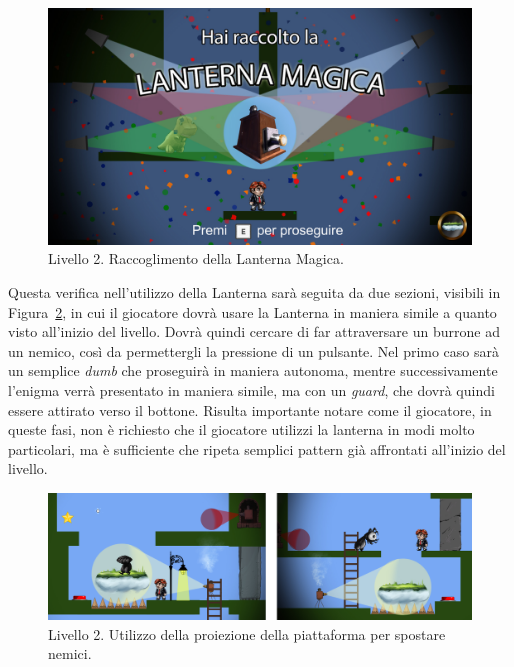 \begin{figure}%
	\centering
	\includegraphics[width= 0.9\columnwidth]{images/gameDesign/48_lanterna.jpg}
	\caption{Livello 2. Raccoglimento della Lanterna Magica.}
	\label{fig:livello2_lanterna}
\end{figure}

Questa verifica nell’utilizzo della Lanterna sarà seguita da due sezioni, visibili in Figura~\ref{fig:livello2_nemici_pulsanti}, in cui il giocatore dovrà usare la Lanterna in maniera simile a quanto visto all’inizio del livello. Dovrà quindi cercare di far attraversare un burrone ad un nemico, così da permettergli la pressione di un pulsante. Nel primo caso sarà un semplice \textit{dumb} che proseguirà in maniera autonoma, mentre successivamente l’enigma verrà presentato in maniera simile, ma con un \textit{guard}, che dovrà quindi essere attirato verso il bottone. Risulta importante notare come il giocatore, in queste fasi, non è richiesto che il giocatore utilizzi la lanterna in modi molto particolari, ma è sufficiente che ripeta semplici pattern già affrontati all’inizio del livello.

\begin{figure}%
	\centering
	\includegraphics[width= 0.98\columnwidth]{images/gameDesign/49_piattaforma_nemici.jpg}
	\caption{Livello 2. Utilizzo della proiezione della piattaforma per spostare nemici.}
	\label{fig:livello2_nemici_pulsanti}
\end{figure}

